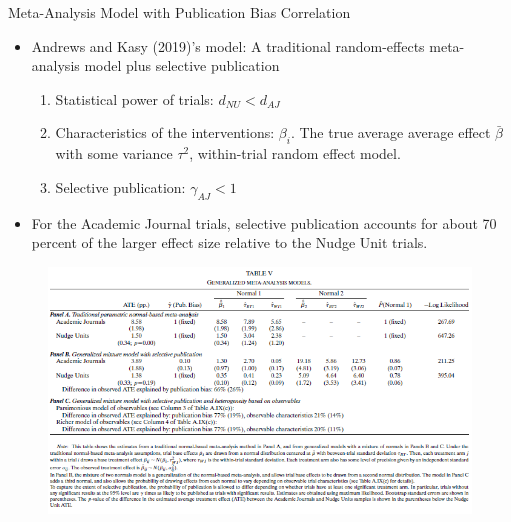\documentclass[dvipdfmx,11pt]{beamer}
\begin{document}
\begin{frame}{Meta-Analysis Model with Publication Bias Correlation}
  \begin{itemize}
    \item Andrews and Kasy (2019)'s model: A traditional random-effects meta-analysis model plus selective publication
    \begin{enumerate}
      \item Statistical power of trials: $d_{NU} < d_{AJ}$
      \item Characteristics of the interventions: $\beta_i$. The true average average effect $\bar{\beta}$ with some variance $\tau^2$, within-trial random effect model.
      \item Selective publication: $\gamma_{AJ} < 1$
    \end{enumerate}
    \item For the Academic Journal trials, selective publication accounts for about 70 percent of the larger effect size relative to the Nudge Unit trials.
  \end{itemize}
\end{frame}

\begin{frame}{}
  \begin{figure}
    \centering
    \includegraphics[scale = .6]{fig_tab/os20220412/T5.png}
  \end{figure}
\end{frame}
\end{document}
